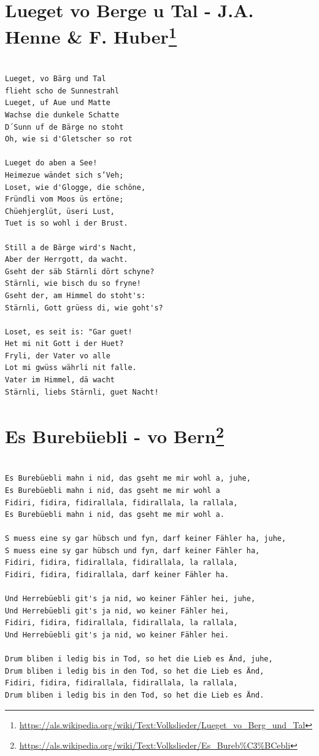 \documentclass[
]{book}
\let\stdsection\section
\renewcommand\section{\clearpage\stdsection}
\begin{document}
\hypertarget{volsklieder-lueged-vo-berge-u-tal}{%
\section[Lueget vo Berge u Tal - J.A. Henne \& F. Huber]{\texorpdfstring{Lueget vo Berge u Tal - J.A. Henne \& F. Huber\footnote{\url{https://als.wikipedia.org/wiki/Text:Volkslieder/Lueget_vo_Berg_und_Tal}}}{Lueget vo Berge u Tal - J.A. Henne \& F. Huber}}\label{volsklieder-lueged-vo-berge-u-tal}}

\begin{verbatim}

Lueget, vo Bärg und Tal
flieht scho de Sunnestrahl
Lueget, uf Aue und Matte
Wachse die dunkele Schatte
D´Sunn uf de Bärge no stoht
Oh, wie si d'Gletscher so rot

Lueget do aben a See!
Heimezue wändet sich s’Veh;
Loset, wie d'Glogge, die schöne,
Fründli vom Moos üs ertöne;
Chüehjerglüt, üseri Lust,
Tuet is so wohl i der Brust.

Still a de Bärge wird's Nacht,
Aber der Herrgott, da wacht.
Gseht der säb Stärnli dört schyne?
Stärnli, wie bisch du so fryne!
Gseht der, am Himmel do stoht's:
Stärnli, Gott grüess di, wie goht's?

Loset, es seit is: "Gar guet!
Het mi nit Gott i der Huet?
Fryli, der Vater vo alle
Lot mi gwüss währli nit falle.
Vater im Himmel, dä wacht
Stärnli, liebs Stärnli, guet Nacht! 
\end{verbatim}

\hypertarget{volsklieder-es-burebuebli}{%
\section[Es Burebüebli - vo Bern]{\texorpdfstring{Es Burebüebli - vo Bern\footnote{\url{https://als.wikipedia.org/wiki/Text:Volkslieder/Es_Bureb\%C3\%BCebli}}}{Es Burebüebli - vo Bern}}\label{volsklieder-es-burebuebli}}

\begin{verbatim}

Es Burebüebli mahn i nid, das gseht me mir wohl a, juhe,
Es Burebüebli mahn i nid, das gseht me mir wohl a
Fidiri, fidira, fidirallala, fidirallala, la rallala,
Es Burebüebli mahn i nid, das gseht me mir wohl a.

S muess eine sy gar hübsch und fyn, darf keiner Fähler ha, juhe,
S muess eine sy gar hübsch und fyn, darf keiner Fähler ha,
Fidiri, fidira, fidirallala, fidirallala, la rallala,
Fidiri, fidira, fidirallala, darf keiner Fähler ha.

Und Herrebüebli git's ja nid, wo keiner Fähler hei, juhe,
Und Herrebüebli git's ja nid, wo keiner Fähler hei,
Fidiri, fidira, fidirallala, fidirallala, la rallala,
Und Herrebüebli git's ja nid, wo keiner Fähler hei.

Drum bliben i ledig bis in Tod, so het die Lieb es Änd, juhe,
Drum bliben i ledig bis in den Tod, so het die Lieb es Änd,
Fidiri, fidira, fidirallala, fidirallala, la rallala,
Drum bliben i ledig bis in den Tod, so het die Lieb es Änd.
\end{verbatim}
\end{document}
